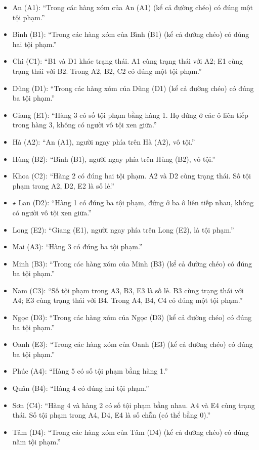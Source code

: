 \begin{itemize}\setlength{\itemsep}{0pt}\small
  \item An (A1): ``Trong các hàng xóm của An (A1) (kể cả đường chéo) có đúng một tội phạm.''
  \item Bình (B1): ``Trong các hàng xóm của Bình (B1) (kể cả đường chéo) có đúng hai tội phạm.''
  \item Chi (C1): ``B1 và D1 khác trạng thái. A1 cùng trạng thái với A2; E1 cùng trạng thái với B2. Trong A2, B2, C2 có đúng một tội phạm.''
  \item Dũng (D1): ``Trong các hàng xóm của Dũng (D1) (kể cả đường chéo) có đúng ba tội phạm.''
  \item Giang (E1): ``Hàng 3 có số tội phạm bằng hàng 1. Họ đứng ở các ô liên tiếp trong hàng 3, không có người vô tội xen giữa.''
  \item Hà (A2): ``An (A1), người ngay phía trên Hà (A2), vô tội.''
  \item Hùng (B2): ``Bình (B1), người ngay phía trên Hùng (B2), vô tội.''
  \item Khoa (C2): ``Hàng 2 có đúng hai tội phạm. A2 và D2 cùng trạng thái. Số tội phạm trong A2, D2, E2 là số lẻ.''
  \item $\star$ Lan (D2): ``Hàng 1 có đúng ba tội phạm, đứng ở ba ô liên tiếp nhau, không có người vô tội xen giữa.''
  \item Long (E2): ``Giang (E1), người ngay phía trên Long (E2), là tội phạm.''
  \item Mai (A3): ``Hàng 3 có đúng ba tội phạm.''
  \item Minh (B3): ``Trong các hàng xóm của Minh (B3) (kể cả đường chéo) có đúng ba tội phạm.''
  \item Nam (C3): ``Số tội phạm trong A3, B3, E3 là số lẻ. B3 cùng trạng thái với A4; E3 cùng trạng thái với B4. Trong A4, B4, C4 có đúng một tội phạm.''
  \item Ngọc (D3): ``Trong các hàng xóm của Ngọc (D3) (kể cả đường chéo) có đúng ba tội phạm.''
  \item Oanh (E3): ``Trong các hàng xóm của Oanh (E3) (kể cả đường chéo) có đúng ba tội phạm.''
  \item Phúc (A4): ``Hàng 5 có số tội phạm bằng hàng 1.''
  \item Quân (B4): ``Hàng 4 có đúng hai tội phạm.''
  \item Sơn (C4): ``Hàng 4 và hàng 2 có số tội phạm bằng nhau. A4 và E4 cùng trạng thái. Số tội phạm trong A4, D4, E4 là số chẵn (có thể bằng 0).''
  \item Tâm (D4): ``Trong các hàng xóm của Tâm (D4) (kể cả đường chéo) có đúng năm tội phạm.''

\end{itemize}
